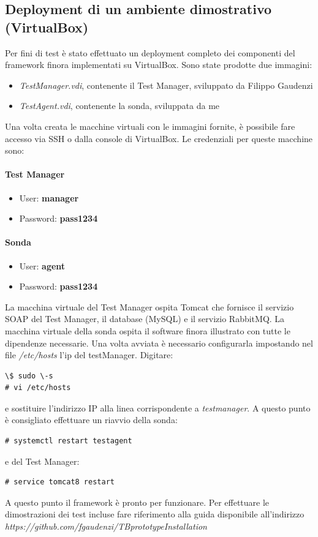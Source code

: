 \documentclass[../main.tex]{subfiles}
\begin{document}
\subsection {Deployment di un ambiente dimostrativo (VirtualBox)}
Per fini di test è stato effettuato un deployment completo dei componenti del framework finora implementati su VirtualBox.
Sono state prodotte due immagini:
\begin{itemize}
\item \textit{TestManager.vdi}, contenente il Test Manager, sviluppato da Filippo Gaudenzi
\item \textit{TestAgent.vdi}, contenente la sonda, sviluppata da me
\end{itemize}
Una volta creata le macchine virtuali con le immagini fornite, è possibile fare accesso via SSH o dalla console di VirtualBox.
Le credenziali per queste macchine sono:
\paragraph{Test Manager}
\begin{itemize}
\item User: \textbf{manager}
\item Password: \textbf{pass1234}
\end{itemize}
\paragraph{Sonda}
\begin{itemize}
\item User: \textbf{agent}
\item Password: \textbf{pass1234}
\end{itemize}
La macchina virtuale del Test Manager ospita Tomcat che fornisce il servizio SOAP del Test Manager, il database (MySQL) e il servizio RabbitMQ. 
La macchina virtuale della sonda ospita il software finora illustrato con tutte le dipendenze necessarie. 
Una volta avviata è necessario configurarla impostando nel file \textit{/etc/hosts} l'ip del testManager.
Digitare:
\begin{verbatim}
\$ sudo \-s
# vi /etc/hosts
\end{verbatim}
e sostituire l'indirizzo IP alla linea corrispondente a \textit{testmanager}.
A questo punto è consigliato effettuare un riavvio della sonda:
\begin{verbatim}
# systemctl restart testagent
\end{verbatim}
e del Test Manager:
\begin{verbatim}
# service tomcat8 restart
\end{verbatim}
A questo punto il framework è pronto per funzionare. Per effettuare le dimostrazioni dei test incluse fare riferimento alla guida disponibile all'indirizzo
\textit{https://github.com/fgaudenzi/TBprototypeInstallation}	
\end{document}
